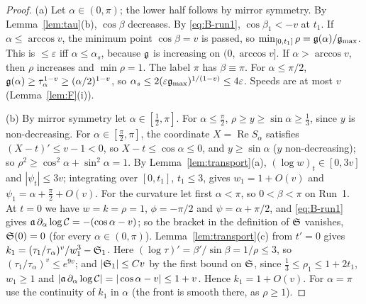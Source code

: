 \begin{proof}
(a) Let $\alpha\in(0,\pi)$; the lower half follows by mirror symmetry. By Lemma~\ref{lem:tau}(b), $\cos\beta$ decreases. By
\eqref{eq:B-run1}, $\cos\beta_1<-v$ at $t_1$. If $\alpha\le\arccos v$, the minimum point $\cos\beta=v$ is passed, so
$\min_{[0,t_1]}\rho=\mathfrak{g}(\alpha)/\mathfrak{g}_{\max}$. This is $\le\varepsilon$ iff $\alpha\le\alpha_s$, because $\mathfrak{g}$ is increasing on
$(0,\arccos v]$. If $\alpha>\arccos v$, then $\rho$ increases and $\min\rho=1$. The label $\pi$ has $\beta\equiv\pi$. For
$\alpha\le\pi/2$, $\mathfrak{g}(\alpha)\ge\tau_\alpha^{1-v}\ge(\alpha/2)^{1-v}$, so $\alpha_s\le2(\varepsilon\mathfrak{g}_{\max})^{1/(1-v)}\le4\varepsilon$.
Speeds are at most $v$ (Lemma~\ref{lem:F}(i)).

(b) By mirror symmetry let $\alpha\in[\frac12,\pi]$. For $\alpha\le\frac\pi2$, $\rho\ge y\ge\sin\alpha\ge\frac13$, since $y$ is
non-decreasing. For $\alpha\in[\frac\pi2,\pi]$, the coordinate $X=\operatorname{Re}S_\alpha$ satisfies $(X-t)'\le v-1<0$, so
$X-t\le\cos\alpha\le0$, and $y\ge\sin\alpha$ ($y$ non-decreasing); so $\rho^2\ge\cos^2\alpha+\sin^2\alpha=1$. By
Lemma~\ref{lem:transport}(a), $(\log w)_t\in[0,3v]$ and $|\psi_t|\le3v$; integrating over $[0,t_1]$, $t_1\le3$, gives
$w_1=1+O(v)$ and $\psi_1=\alpha+\frac\pi2+O(v)$. For the curvature let first $\alpha<\pi$, so $0<\beta<\pi$ on Run~1. At $t=0$
we have $w=k=\rho=1$, $\phi=-\pi/2$ and $\psi=\alpha+\pi/2$, and \eqref{eq:B-run1} gives $\mathfrak{a}\,\partial_\alpha\log\mathcal C=-(\cos\alpha-v)$;
so the bracket in the definition of $\mathfrak{S}$ vanishes, $\mathfrak{S}(0)=0$ (for every $\alpha\in(0,\pi)$). Lemma~\ref{lem:transport}(c)
from $t'=0$ gives $k_1=(\tau_1/\tau_\alpha)^v/w_1^3-\mathfrak{S}_1$. Here $(\log\tau)'=\beta'/\sin\beta=1/\rho\le3$, so
$(\tau_1/\tau_\alpha)^v\le e^{9v}$; and $|\mathfrak{S}_1|\le Cv$ by the first bound on $\mathfrak{S}$, since $\frac13\le\rho_1\le1+2t_1$, $w_1\ge1$
and $|\mathfrak{a}\,\partial_\alpha\log\mathcal C|=|\cos\alpha-v|\le1+v$. Hence $k_1=1+O(v)$. For $\alpha=\pi$ use the continuity of $k_1$ in $\alpha$ (the
front is smooth there, as $\rho\ge1$).


\end{proof}

